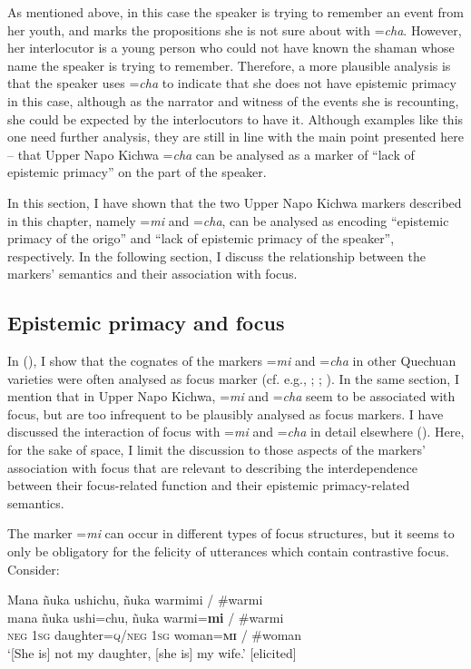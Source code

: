 \documentclass[output=paper]{langscibook}
\begin{document}
As mentioned above, in this case the speaker is trying to remember an event from her youth, and marks the propositions she is not sure about with =\textit{cha}. However, her interlocutor is a young person who could not have known the shaman whose name the speaker is trying to remember. Therefore, a more plausible analysis is that the speaker uses =\textit{cha} to indicate that she does not have epistemic primacy in this case, although as the narrator and witness of the events she is recounting, she could be expected by the interlocutors to have it. Although examples like this one need further analysis, they are still in line with the main point presented here – that Upper Napo Kichwa =\textit{cha} can be analysed as a marker of “lack of epistemic primacy” on the part of the speaker.

In this section, I have shown that the two Upper Napo Kichwa markers described in this chapter, namely =\textit{mi} and =\textit{cha}, can be analysed as encoding “epistemic primacy of the origo” and “lack of epistemic primacy of the speaker”, respectively. In the following section, I discuss the relationship between the markers’ semantics and their association with focus.


\subsection{Epistemic primacy and focus}\label{s:kg4-2}

In  (), I show that the cognates of the markers =\textit{mi} and =\textit{cha} in other Quechuan  varieties were often analysed as focus marker (cf. e.g., \citealt{Muysken1995}; \citealt{Sanchez2010}; \citeyear{Sanchez2015}). In the same section, I mention that in Upper Napo Kichwa, =\textit{mi} and =\textit{cha} seem to be associated with focus, but are too infrequent to be plausibly analysed as focus markers. I have discussed the interaction of focus with =\textit{mi} and =\textit{cha} in detail elsewhere (\citealt[ch.4]{Grzech2016a}). Here, for the sake of space, I limit the discussion to those aspects of the markers’ association with focus that are relevant to describing the interdependence between their focus-related function and their epistemic primacy-related semantics.
 
The marker =\textit{mi} can occur in different types of focus structures, but it seems to only be obligatory for the felicity of utterances which contain contrastive focus. Consider:

\begin{exe}
	\ex \label{ex:kg17}
	\glll Mana ñuka ushichu, ñuka warmimi / \#warmi\\
	mana ñuka ushi=chu, ñuka warmi=\textbf{mi} / \#warmi\\
	\textsc{neg}	 1\textsc{sg} daughter=\textsc{q}/\textsc{neg} 1\textsc{sg} woman=\textbf{\textsc{mi}} / \#woman\\
	\trans ‘[She is] not my daughter, [she is] my wife.’ [elicited]
\end{exe}
\end{document}
